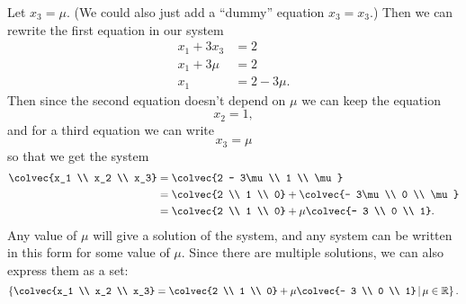 {Let $x_3 = \mu$. (We could also just add a ``dummy'' equation $x_3=x_3$.) Then we can rewrite the first equation in our system
\begin{align*}
 x_1+ 3x_3 &= 2\\
x_1+ 3\mu &= 2\\
x_1 &= 2 -3\mu.
\end{align*}
Then since the second equation doesn't depend on $\mu$ we can keep the equation 
\[  x_2 = 1, \]
and for a third equation we can write
\[x_3 = \mu \]
so that we get the system
\begin{align*}
  \colvec{x_1 \\ x_2 \\ x_3}
  &= \colvec{2 - 3\mu \\ 1 \\ \mu}\\
	&=  \colvec{2 \\ 1 \\ 0} +  \colvec{- 3\mu \\ 0 \\ \mu} \\
	&= \colvec{2 \\ 1 \\ 0} +  \mu \colvec{- 3 \\ 0 \\ 1}.
\end{align*}
Any value of $\mu$ will give a solution of the system, and any system can be written in this form for some value of $\mu$. Since there are multiple solutions, we can also express them as a set:
\[
\left\{ \colvec{x_1 \\ x_2 \\ x_3} = \colvec{2 \\ 1 \\ 0} + \mu \colvec{- 3 \\ 0 \\ 1}
\; \vline \; \mu \in \mathbb{R} \right\}.
\]

}

